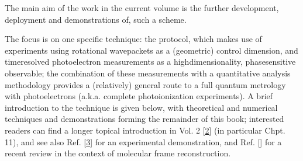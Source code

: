 \documentclass[letterpaper,table,10pt,english]{jupyterBook}
\begin{document}
\sphinxAtStartPar
The main aim of the work in the current volume is the further development, deployment and demonstrations of, such a scheme.

\sphinxAtStartPar
The focus is on one specific  technique: the  protocol, which makes use of experiments using rotational wavepackets as a (geometric) control dimension, and time\sphinxhyphen{}resolved photoelectron measurements as a high\sphinxhyphen{}dimensionality, phase\sphinxhyphen{}sensitive observable; the combination of these measurements with a quantitative analysis methodology provides a (relatively) general route to a full quantum metrology with photoelectrons (a.k.a. complete photoionization experiments). A brief introduction to the technique is given below, with theoretical and numerical techniques and demonstrations forming the remainder of this book; interested readers can find a longer topical introduction in  Vol. 2 {[}\hyperlink{cite.backmatter/bibliography:id570}{2}{]} (in particular Chpt. 11), and see also Ref. {[}\hyperlink{cite.backmatter/bibliography:id649}{3}{]} for an experimental demonstration, and Ref. {[}{]} for a recent review in the context of molecular frame reconstruction.
\end{document}
